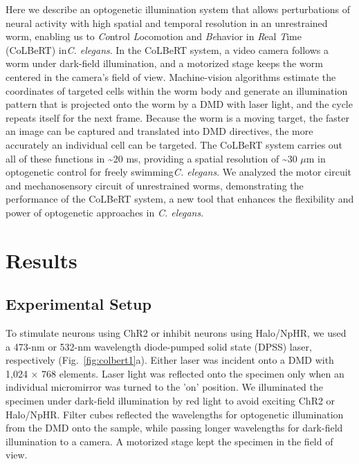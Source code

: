 Here we describe an optogenetic illumination system that allows perturbations of neural activity with high spatial and temporal resolution in an unrestrained worm, enabling us to \emph{Co}ntrol \emph{L}ocomotion and \emph{Be}havior in \emph{R}eal \emph{T}ime (CoLBeRT) in\textit{C. elegans}. In the CoLBeRT system, a video camera follows a worm under dark-field illumination, and a motorized stage keeps the worm centered in the camera's field of view. Machine-vision algorithms estimate the coordinates of targeted cells within the worm body and generate an illumination pattern that is projected onto the worm by a DMD with laser light, and the cycle repeats itself for the next frame. Because the worm is a moving target, the faster an image can be captured and translated into DMD directives, the more accurately an individual cell can be targeted. The CoLBeRT system carries out all of these functions in \textasciitilde20 ms, providing a spatial resolution of \textasciitilde30 $\mu$m in optogenetic control for freely swimming\textit{C. elegans}. We analyzed the motor circuit and mechanosensory circuit of unrestrained worms, demonstrating the performance of the CoLBeRT system, a new tool that enhances the flexibility and power of optogenetic approaches in \textit{C. elegans}.

\section{Results}
\subsection{Experimental Setup}
To stimulate neurons using ChR2 or inhibit neurons using Halo/NpHR, we used a 473-nm or 532-nm wavelength diode-pumped solid state (DPSS) laser, respectively  (Fig.~\ref{fig:colbert1}a). Either laser was incident onto a DMD with 1,024 × 768 elements. Laser light was reflected onto the specimen only when an individual micromirror was turned to the 'on' position. We illuminated the specimen under dark-field illumination by red light to avoid exciting ChR2 or Halo/NpHR. Filter cubes reflected the wavelengths for optogenetic illumination from the DMD onto the sample, while passing longer wavelengths for dark-field illumination to a camera. A motorized stage kept the specimen in the field of view.



